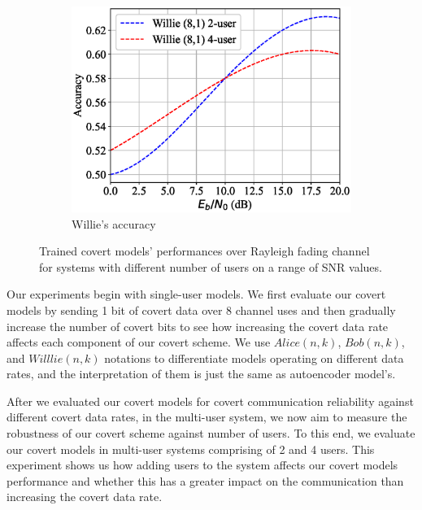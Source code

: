\begin{figure}[tp!]
\begin{subfigure}{0.32\textwidth}
		\includegraphics[width=\linewidth]{figs/multi_willie_accuracy_rayleigh}
		\caption{Willie's accuracy}
		\label{fig:multi_rayleigh_results_willie}
	\end{subfigure}
	\caption{Trained covert models' performances over Rayleigh fading channel for systems with different number of users on a range of SNR values.}
	\label{fig:multi_rayleigh_results}
\end{figure}

Our experiments begin with single-user models. We first evaluate our covert models by sending 1 bit of covert data over 8 channel uses and then gradually increase the number of covert bits to see how increasing the covert data rate affects each component of our covert scheme. We use \(Alice (n,k)\), \(Bob (n,k)\), and \(Willlie (n,k)\) notations to differentiate models operating on different data rates, and the interpretation of them is just the same as autoencoder model's. 

After we evaluated our covert models for covert communication reliability against different covert data rates, in the multi-user system, we now aim to measure the robustness of our covert scheme against number of users. To this end, we evaluate our covert models in multi-user systems comprising of 2 and 4 users. This experiment shows us how adding users to the system affects our covert models performance and whether this has a greater impact on the communication than increasing the covert data rate.

